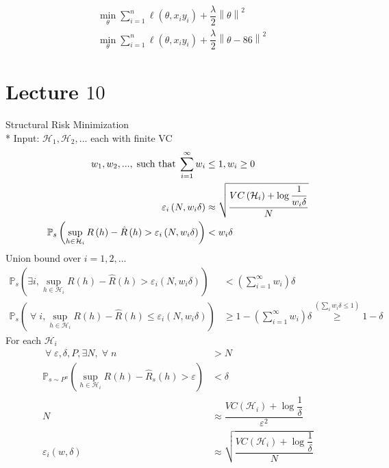 \documentclass{article}
\begin{document}
\begin{align*}
&\displaystyle\min_{\theta} \displaystyle\sum_{i=1}^{n} \ell\left(\theta, x_{i} y_{i}\right) + \dfrac{\lambda}{2} \left\|\theta\right\|^{2}
\\ &\displaystyle\min_{\theta} \displaystyle\sum_{i=1}^{n} \ell\left(\theta, x_{i} y_{i}\right) + \dfrac{\lambda}{2} \left\|\theta - 86\right\|^{2}
\end{align*}



\section{Lecture $10$} 
Structural Risk Minimization
\\* Input: $\mathcal{H}_{1}, \mathcal{H}_{2}, ...$ each with finite VC
\begin{align*}
w_{1}, w_{2}, ..., \text{\;such that\;} \displaystyle\sum_{i=1}^{\infty} w_{i} &\leq  1, w_{i} \geq  0
\\ \varepsilon_{i}\left(N, w_{i} \delta\right) &\approx \sqrt{\dfrac{VC\left(\mathcal{H}_{i}\right)  + \log \dfrac{1}{w_{i} \delta}}{N}}
\\ \mathbb{P}_{s}\left(\displaystyle\sup_{h \in \mathcal{H}_{i}} R\left(h\right) - \hat{R}\left(h\right) > \varepsilon_{i}\left(N, w_{i} \delta\right)\right) &< w_{i} \delta
\end{align*}
Union bound over $i  = 1, 2, ...$
\begin{align*}
\mathbb{P}_{s}\left(\exists i, \displaystyle\sup_{h \in \mathcal{H}_{i}} R\left(h\right) - \hat{R}\left(h\right) > \varepsilon_{i}\left(N, w_{i} \delta\right)\right) &< \left(\displaystyle\sum_{i=1}^{\infty} w_{i}\right) \delta
\\ \mathbb{P}_{s}\left(\;\forall\; i, \displaystyle\sup_{h \in \mathcal{H}_{i}} R\left(h\right) - \hat{R}\left(h\right) \leq  \varepsilon_{i}\left(N, w_{i} \delta\right)\right) &\geq  1 - \left(\displaystyle\sum_{i=1}^{\infty} w_{i}\right) \delta \stackrel{\left(\displaystyle\sum_{i} w_{i} \delta \leq  1\right)}{\geq} 1 - \delta
\end{align*}
For each $\mathcal{H}_{i}$
\begin{align*}
\;\forall\; \varepsilon, \delta, P, \exists N, \;\forall\; n &> N 
\\ \mathbb{P}_{s \sim  P^{n}}\left(\displaystyle\sup_{h \in \mathcal{H}_{i}} R\left(h\right) - \hat{R}_{s}\left(h\right) > \varepsilon\right) &< \delta
\\ N  &\approx \dfrac{VC\left(\mathcal{H}_{i}\right)  + \log \dfrac{1}{\delta}}{\varepsilon^{2}}
\\ \varepsilon_{i}\left(w, \delta\right) &\approx \sqrt{\dfrac{VC\left(\mathcal{H}_{i}\right)  + \log \dfrac{1}{\delta}}{N}}
\end{align*}
\end{document}
